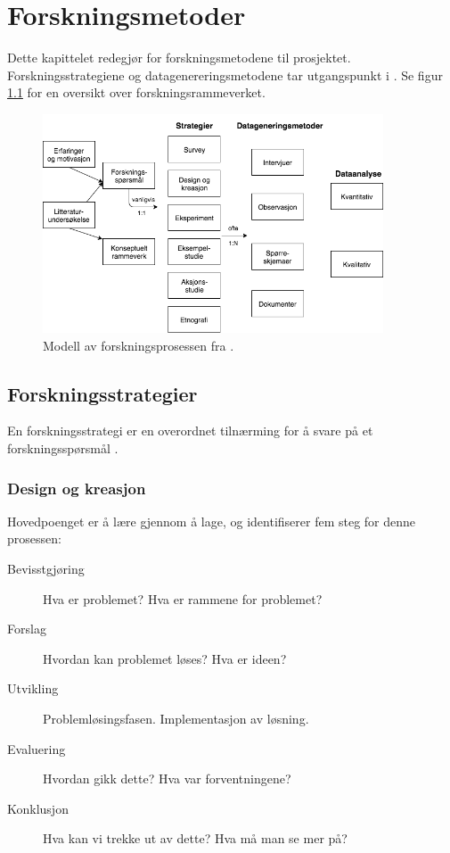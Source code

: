\chapter{Forskningsmetoder}
\label{ch:method}
Dette kapittelet redegjør for forskningsmetodene til prosjektet. Forskningsstrategiene og datagenereringsmetodene
tar utgangspunkt i \citet{oates}. Se figur \ref{fig:oates_model} for en oversikt over forskningsrammeverket.

\begin{figure}
\centering
\includegraphics[width=0.90\textwidth]{fig/oates/oates_research_norwegian}
\caption{Modell av forskningsprosessen fra \citet{oates}.}
\label{fig:oates_model}
\end{figure}

\section{Forskningsstrategier}
En forskningsstrategi er en overordnet tilnærming for å svare på et forskningsspørsmål \citep[s. 35]{oates}.

\subsection{Design og kreasjon}
Hovedpoenget er å lære gjennom å lage, og \citet{oates} identifiserer fem steg for denne prosessen:

\begin{description}
  \item[Bevisstgjøring] Hva er problemet? Hva er rammene for problemet?
  \item[Forslag] Hvordan kan problemet løses? Hva er ideen?
  \item[Utvikling] Problemløsingsfasen. Implementasjon av løsning.
  \item[Evaluering] Hvordan gikk dette? Hva var forventningene?
  \item[Konklusjon] Hva kan vi trekke ut av dette? Hva må man se mer på?
\end{description}

